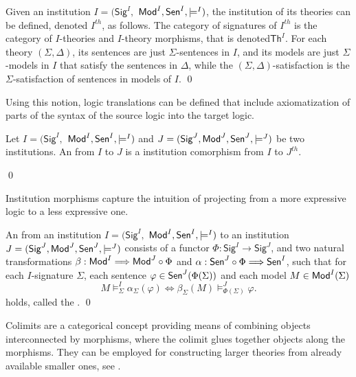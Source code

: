 \documentclass[10pt,fleqn,final]{scrreprt}
\newcommand{\cbs}[0]{\color{red}\xspace} %
\newcommand{\cbe}[0]{\color{black}\xspace} %
\newcommand{\Sig}{\mathsf{Sig}}
\renewcommand{\Th}{\mathsf{Th}}
\newenvironment{definitions}[0]{\medskip }{}
\begin{document}
\begin{definitions}
\begin{definition}
  Given an institution  $I = (\Sig^I,$ $ \mathsf{Mod}^I, \mathsf{Sen}^I, \models^I)$,\cbs the
   institution of its theories can be defined,\cbe denoted $I^{th}$, as follows. The category of signatures of $I^{th}$ is the category
   of $I$-theories and $I$-theory morphisms, that\cbs  is denoted\cbe $\Th^I$.
   For each theory $(\Sigma, \Delta)$, its sentences are just $\Sigma$-sentences in $I$, and
   its models are just $\Sigma$-models in $I$ that satisfy the sentences in $\Delta$, while the
   $(\Sigma,\Delta)$-satisfaction is the $\Sigma$-satisfaction of sentences in models of $I$.
\qed \end{definition}

Using this notion,\cbs logic translations can be defined\cbe that include axiomatization of parts of the
syntax of the source logic into the target logic.

\begin{definition}

 Let $I = (\Sig^I,$ $ \mathsf{Mod}^I, \mathsf{Sen}^I, \models^I)$ and $J = (\Sig^J, \Mod^J,
\Sen^J, \models^J)$ be two institutions. An  from $I$ to
$J$ is a institution comorphism from $I$ to $J^{th}$.

\qed\end{definition}

\medskip

Institution morphisms capture the intuition of projecting from a more expressive logic to a less expressive one.

\begin{definition} 
An  from an institution $I = (\Sig^I,$ $ \mathsf{Mod}^I, \mathsf{Sen}^I, \models^I)$ to
an institution $J = (\Sig^J, \Mod^J,
\Sen^J, \models^J)$ consists of a functor $\Phi : \Sig^I \longrightarrow \Sig^J$, and two
natural transformations $\beta: \mathsf{Mod}^I \Longrightarrow \mathsf{Mod}^J \circ \Phi$
and $\alpha:  \mathsf{Sen}^J \circ \Phi \Longrightarrow \mathsf{Sen}^I $, such that for each $I$-signature $\Sigma$, each sentence $\varphi\in\mathsf{Sen}^J(\Phi(\Sigma))$ and each model $M\in\mathsf{Mod}^I(\Sigma)$
$$ M\models^{I}_{\Sigma}\alpha_{\Sigma}(\varphi) \Leftrightarrow
\beta_{\Sigma}(M)\models^J_{\Phi(\Sigma)}\varphi.
$$
holds, called the .
\qed\end{definition}

Colimits are a categorical concept providing means of
combining objects interconnected by morphisms, where the colimit
glues together objects along the morphisms.
They can be employed for constructing larger theories from already available 
smaller ones, see \cite{GoguenBurstall92}. 


\end{definitions}
\end{document}
